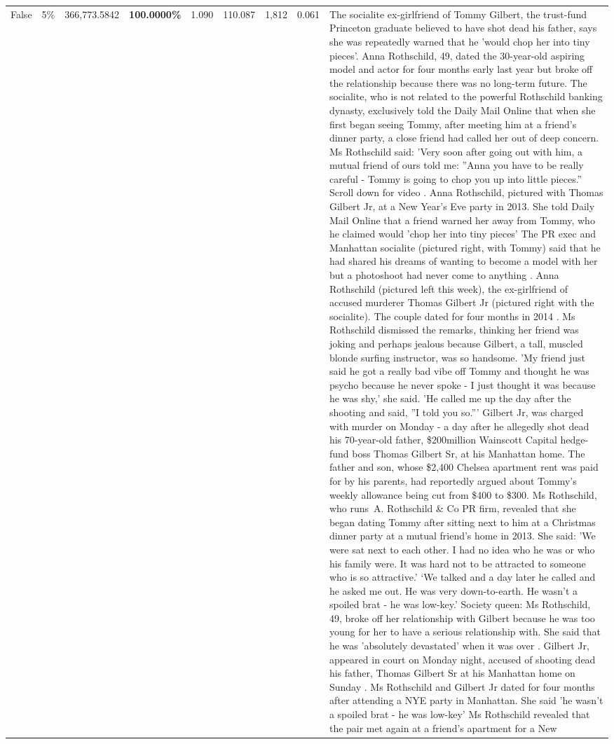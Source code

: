 \begin{table}[H]
\begin{tabular}{lllrlllll}
False & 5\% & 366,773.5842 & \bfseries \color{red} 100.0000\% & 1.090 & 110.087 & 1,812 & 0.061 & The socialite ex-girlfriend of Tommy Gilbert, the trust-fund Princeton graduate believed to have shot dead his father, says she was repeatedly warned that he 'would chop her into tiny pieces'. Anna Rothschild, 49, dated the 30-year-old aspiring model and actor for four months early last year but broke off the relationship because there was no long-term future. The socialite, who is not related to the powerful Rothschild banking dynasty, exclusively told the Daily Mail Online that when she first began seeing Tommy, after meeting him at a friend's dinner party, a close friend had called her out of deep concern. Ms Rothschild said: 'Very soon after going out with him, a mutual friend of ours told me: ''Anna you have to be really careful - Tommy is going to chop you up into little pieces.'' Scroll down for video . Anna Rothschild, pictured with Thomas Gilbert Jr, at a New Year's Eve party in 2013. She told Daily Mail Online that a friend warned her away from Tommy, who he claimed would 'chop her into tiny pieces' The PR exec and Manhattan socialite (pictured right, with Tommy) said that he had shared his dreams of wanting to become a model with her but a photoshoot had never come to anything . Anna Rothschild (pictured left this week), the ex-girlfriend of accused murderer Thomas Gilbert Jr (pictured right with the socialite). The couple dated for four months in 2014 . Ms Rothschild dismissed the remarks, thinking her friend was joking and perhaps jealous because Gilbert, a tall, muscled blonde surfing instructor, was so handsome. 'My friend just said he got a really bad vibe off Tommy and thought he was psycho because he never spoke - I just thought it was because he was shy,' she said. 'He called me up the day after the shooting and said, ''I told you so.''' Gilbert Jr, was charged with murder on Monday - a day after he allegedly shot dead his 70-year-old father, \$200million Wainscott Capital hedge-fund boss Thomas Gilbert Sr, at his Manhattan home. The father and son, whose \$2,400 Chelsea apartment rent was paid for by his parents, had reportedly argued about Tommy's weekly allowance being cut from \$400 to \$300. Ms Rothschild, who runs A. Rothschild \& Co PR firm, revealed that she began dating Tommy after sitting next to him at a Christmas dinner party at a mutual friend's home in 2013. She said: 'We were sat next to each other. I had no idea who he was or who his family were. It was hard not to be attracted to someone who is so attractive.' ‘We talked and a day later he called and he asked me out. He was very down-to-earth. He wasn’t a spoiled brat - he was low-key.’ Society queen: Ms Rothschild, 49, broke off her relationship with Gilbert because he was too young for her to have a serious relationship with. She said that he was 'absolutely devastated' when it was over . Gilbert Jr, appeared in court on Monday night, accused of shooting dead his father, Thomas Gilbert Sr at his Manhattan home on Sunday . Ms Rothschild and Gilbert Jr dated for four months after attending a NYE party in Manhattan. She said 'he wasn't a spoiled brat - he was low-key' Ms Rothschild revealed that the pair met again at a friend’s apartment for a New 
\end{tabular}
\end{table}
